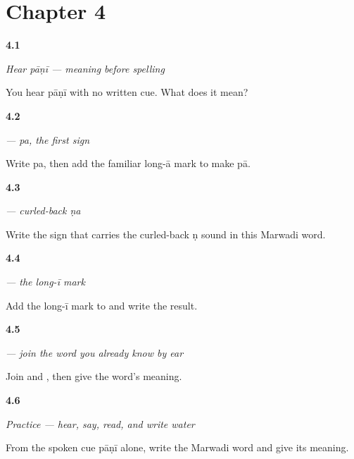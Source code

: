 \section*{Chapter 4}

\noindent\begin{minipage}[t]{\linewidth}
\raggedright
\hypertarget{review-MW-C04-hear-paani-meaning}{\textbf{4.1}} \emph{Hear \emph{pāṇī} — meaning before spelling}\par
\small You hear pāṇī with no written cue. What does it mean?
\end{minipage}\par\medskip

\noindent\begin{minipage}[t]{\linewidth}
\raggedright
\hypertarget{review-MW-W04-pa-build-paa}{\textbf{4.2}} \emph{ — \emph{pa}, the first sign}\par
\small Write pa, then add the familiar long-ā mark to make pā.
\end{minipage}\par\medskip

\noindent\begin{minipage}[t]{\linewidth}
\raggedright
\hypertarget{review-MW-W04-nna-contrast}{\textbf{4.3}} \emph{ — curled-back \emph{ṇa}}\par
\small Write the sign that carries the curled-back ṇ sound in this Marwadi word.
\end{minipage}\par\medskip

\noindent\begin{minipage}[t]{\linewidth}
\raggedright
\hypertarget{review-MW-W04-ii-matra-build}{\textbf{4.4}} \emph{ — the long-\emph{ī} mark}\par
\small Add the long-ī mark to  and write the result.
\end{minipage}\par\medskip

\noindent\begin{minipage}[t]{\linewidth}
\raggedright
\hypertarget{review-MW-C04-paani-build}{\textbf{4.5}} \emph{ — join the word you already know by ear}\par
\small Join  and , then give the word's meaning.
\end{minipage}\par\medskip

\noindent\begin{minipage}[t]{\linewidth}
\raggedright
\hypertarget{review-MW-C04-practice-paani}{\textbf{4.6}} \emph{Practice — hear, say, read, and write water}\par
\small From the spoken cue pāṇī alone, write the Marwadi word and give its meaning.
\end{minipage}\par\medskip


